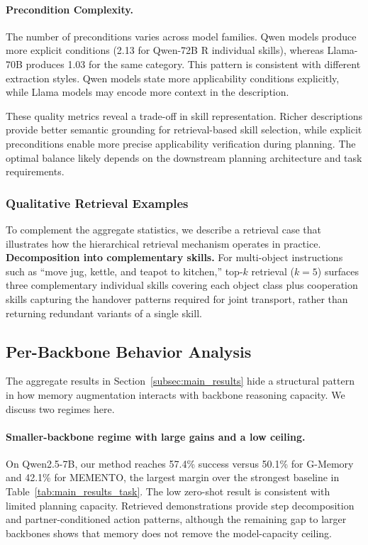 \documentclass{article}
\theoremstyle{plain}
\theoremstyle{definition}
\theoremstyle{remark}
\begin{document}
\paragraph{Precondition Complexity.}
The number of preconditions varies across model families. Qwen models produce more explicit conditions (2.13 for Qwen-72B R individual skills), whereas Llama-70B produces 1.03 for the same category. This pattern is consistent with different extraction styles. Qwen models state more applicability conditions explicitly, while Llama models may encode more context in the description.

These quality metrics reveal a trade-off in skill representation. Richer descriptions provide better semantic grounding for retrieval-based skill selection, while explicit preconditions enable more precise applicability verification during planning. The optimal balance likely depends on the downstream planning architecture and task requirements.

\subsubsection{Qualitative Retrieval Examples}
\label{subsec:retrieval_examples}

To complement the aggregate statistics, we describe a retrieval case that illustrates how the hierarchical retrieval mechanism operates in practice. \textbf{Decomposition into complementary skills.} For multi-object instructions such as ``move jug, kettle, and teapot to kitchen,'' top-$k$ retrieval ($k{=}5$) surfaces three complementary individual skills covering each object class plus cooperation skills capturing the handover patterns required for joint transport, rather than returning redundant variants of a single skill.

\subsection{Per-Backbone Behavior Analysis}
\label{sec:per_backbone}

The aggregate results in Section~\ref{subsec:main_results} hide a structural pattern in how memory augmentation interacts with backbone reasoning capacity. We discuss two regimes here.

\paragraph{Smaller-backbone regime with large gains and a low ceiling.} On Qwen2.5-7B, our method reaches 57.4\% success versus 50.1\% for G-Memory and 42.1\% for MEMENTO, the largest margin over the strongest baseline in Table~\ref{tab:main_results_task}. The low zero-shot result is consistent with limited planning capacity. Retrieved demonstrations provide step decomposition and partner-conditioned action patterns, although the remaining gap to larger backbones shows that memory does not remove the model-capacity ceiling.
\end{document}
